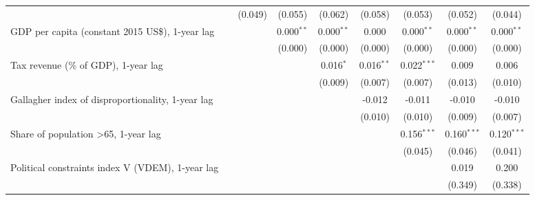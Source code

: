 \begin{table}[htbp]
\begin{tabular}{lcccccccc}
                                                                                      &               & (0.049)       & (0.055)       & (0.062)      & (0.058)       & (0.053)       & (0.052)       & (0.044)\\   
      GDP per capita (constant 2015 US\$), 1-year lag                                 &               &               & 0.000$^{**}$  & 0.000$^{**}$ & 0.000         & 0.000$^{**}$  & 0.000$^{**}$  & 0.000$^{**}$\\   
                                                                                      &               &               & (0.000)       & (0.000)      & (0.000)       & (0.000)       & (0.000)       & (0.000)\\   
      Tax revenue (\% of GDP), 1-year lag                                             &               &               &               & 0.016$^{*}$  & 0.016$^{**}$  & 0.022$^{***}$ & 0.009         & 0.006\\   
                                                                                      &               &               &               & (0.009)      & (0.007)       & (0.007)       & (0.013)       & (0.010)\\   
      Gallagher index of disproportionality, 1-year lag                               &               &               &               &              & -0.012        & -0.011        & -0.010        & -0.010\\   
                                                                                      &               &               &               &              & (0.010)       & (0.010)       & (0.009)       & (0.007)\\   
      Share of population >65, 1-year lag                                             &               &               &               &              &               & 0.156$^{***}$ & 0.160$^{***}$ & 0.120$^{***}$\\   
                                                                                      &               &               &               &              &               & (0.045)       & (0.046)       & (0.041)\\   
      Political constraints index V (VDEM), 1-year lag                                &               &               &               &              &               &               & 0.019         & 0.200\\   
                                                                                      &               &               &               &              &               &               & (0.349)       & (0.338)\\   

\end{tabular}
\end{table}
